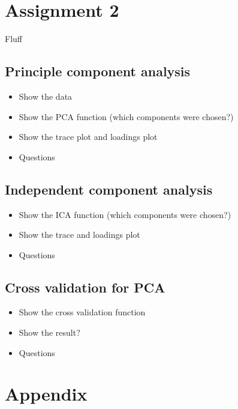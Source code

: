 \documentclass[a4paper, twocolumn]{article}
\begin{document}
    \section*{Assignment 2}
    Fluff
    \subsection{Principle component analysis}
    \begin{itemize}
        \item Show the data 
        \item Show the PCA function (which components were chosen?)
        \item Show the trace plot and loadings plot
        \item Questions
    \end{itemize}
    \subsection{Independent component analysis}
    \begin{itemize}
        \item Show the ICA function (which components were chosen?)
        \item Show the trace and loadings plot
        \item Questions
    \end{itemize}
    \subsection{Cross validation for PCA}
    \begin{itemize}
        \item Show the cross validation function
        \item Show the result?
        \item Questions
    \end{itemize}
    \nocite{*} %
    
    
    \onecolumn \appendix
    \section*{Appendix}
\end{document}
